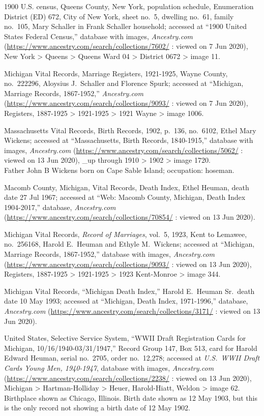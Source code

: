 \begin{thebibliography}{999}
1900 U.S. census, Queens County, New York, population schedule, Enumeration District (ED) 672, City of New York, sheet no.\ 5, dwelling no.\ 61, family no.\ 105, Mary Schaller in Frank Schaller household; accessed at ``1900 United States Federal Census,'' database with images, \textit{Ancestry.com} (\url{https://www.ancestry.com/search/collections/7602/} : viewed on 7 Jun 2020), New York > Queens > Queens Ward 04 > District 0672 > image 11.

Michigan Vital Records, Marriage Registers, 1921-1925, Wayne County, no.\ 222296, Aloysius J.\ Schaller and Florence Spurk; accessed at ``Michigan, Marriage Records, 1867-1952,'' \textit{Ancestry.com} (\url{https://www.ancestry.com/search/collections/9093/} : viewed on 7 Jun 2020), Registers, 1887-1925 > 1921-1925 > 1921 Wayne > image 1006.

Massachusetts Vital Records, Birth Records, 1902, p.\ 136, no.\ 6102, Ethel Mary Wickens; accessed at ``Massachusetts, Birth Records, 1840-1915,'' database with images, \textit{Ancestry.com} (\url{https://www.ancestry.com/search/collections/5062/} : viewed on 13 Jun 2020), \_up through 1910 > 1902 > image 1720.\\
Father John B Wickens born on Cape Sable Island; occupation: hoseman.

Macomb County, Michigan, Vital Records, Death Index, Ethel Heuman, death date 27 Jul 1967; accessed at ``Web: Macomb County, Michigan, Death Index 1904-2017,'' database, \textit{Ancestry.com} (\url{https://www.ancestry.com/search/collections/70854/} : viewed on 13 Jun 2020).

Michigan Vital Records, \textit{Record of Marriages}, vol.\ 5, 1923, Kent to Lemawee, no.\ 256168, Harold E.\ Heuman and Ethyle M.\ Wickens; accessed at ``Michigan, Marriage Records, 1867-1952,'' database with images, \textit{Ancestry.com} (\url{https://www.ancestry.com/search/collections/9093/} : viewed on 13 Jun 2020),  Registers, 1887-1925 > 1921-1925 > 1923 Kent-Monroe > image 344.

Michigan Vital Records, ``Michigan Death Index,'' Harold E.\ Heuman Sr.\, death date 10 May 1993; accessed at ``Michigan, Death Index, 1971-1996,'' database, \textit{Ancestry.com} (\url{https://www.ancestry.com/search/collections/3171/} : viewed on 13 Jun 2020).

United States, Selective Service System, ``WWII Draft Registration Cards for Michigan, 10/16/1940-03/31/1947,'' Record Group 147, Box 513, card for Harold Edward Heuman, serial no.\ 2705, order no.\ 12,278; accessed at \textit{U.S.\ WWII Draft Cards Young Men, 1940-1947}, database with images, \textit{Ancestry.com} (\url{https://www.ancestry.com/search/collections/2238/} : viewed on 13 Jun 2020), Michigan > Hartman-Holliday > Heuer, Harold-Hiatt, Weldon > image 62.\\
Birthplace shown as Chicago, Illinois. Birth date shown as 12 May 1903, but this is the only record not showing a birth date of 12 May 1902.


\end{thebibliography}
